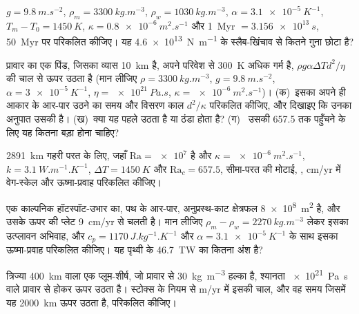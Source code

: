 \begin{exercise}[$\star$]\label{exo:b3:mantle-convection:4}
$g = \qty{9.8}{m.s^{-2}}$, $\rho_m = \qty{3300}{kg.m^{-3}}$, $\rho_w =
\qty{1030}{kg.m^{-3}}$, $\alpha = \qty{3.1e-5}{K^{-1}}$, $T_m - T_0 =
\qty{1450}{K}$, $\kappa = \qty{0.8e-6}{m^2.s^{-1}}$ और \qty{1}{Myr} $=
\qty{3.156e13}{s}$, \qty{50}{Myr} पर  परिकलित कीजिए। यह
\qty{4.6e13}{N.m^{-1}} के स्लैब-खिंचाव से कितने गुना छोटा है?
\end{exercise}

\begin{exercise}[$\star\star$]\label{exo:b3:mantle-convection:5}
प्रावार का एक पिंड, जिसका व्यास \qty{10}{km} है, अपने परिवेश से \qty{300}{K} अधिक गर्म है,
$\rho g\alpha\Delta Td^2/\eta$ की चाल से ऊपर उठता है (मान लीजिए $\rho =
\qty{3300}{kg.m^{-3}}$, $g = \qty{9.8}{m.s^{-2}}$, $\alpha = \qty{3e-5}{K^{-1}}$,
$\eta = \qty{e21}{Pa.s}$, $\kappa = \qty{e-6}{m^2.s^{-1}}$)। (क)~इसका
अपने ही आकार के आर-पार उठने का समय और विसरण काल $d^2/\kappa$ परिकलित कीजिए, और
दिखाइए कि उनका अनुपात उसकी  है। (ख)~क्या यह पहले उठता है या ठंडा होता है? (ग)~
उसकी  657.5 तक पहुँचने के लिए यह कितना बड़ा होना चाहिए?
\end{exercise}

\begin{exercise}[$\star\star$]\label{exo:b3:mantle-convection:6}
\qty{2891}{km} गहरी परत के लिए, जहाँ $\mathrm{Ra} = \num{e7}$ है और $\kappa =
\qty{e-6}{m^2.s^{-1}}$, $k = \qty{3.1}{W.m^{-1}.K^{-1}}$, $\Delta T =
\qty{1450}{K}$ और $\mathrm{Ra}_c = 657.5$, सीमा-परत की
मोटाई, , \unit{cm/yr} में वेग-स्केल और ऊष्मा-प्रवाह
परिकलित कीजिए।
\end{exercise}

\begin{exercise}[$\star\star$]\label{exo:b3:mantle-convection:7}
एक काल्पनिक हॉटस्पॉट-उभार का, पथ के आर-पार, अनुप्रस्थ-काट
क्षेत्रफल \qty{8e8}{m^2} है, और उसके ऊपर की प्लेट \qty{9}{cm/yr} से चलती है। मान लीजिए $\rho_m - \rho_w =
\qty{2270}{kg.m^{-3}}$ लेकर इसका उत्प्लावन अभिवाह, और $c_p =
\qty{1170}{J.kg^{-1}.K^{-1}}$ और $\alpha = \qty{3.1e-5}{K^{-1}}$ के साथ इसका ऊष्मा-प्रवाह परिकलित कीजिए।
यह पृथ्वी के \qty{46.7}{TW} का कितना अंश है?
\end{exercise}

\begin{exercise}[$\star\star$]\label{exo:b3:mantle-convection:8}
त्रिज्या \qty{400}{km} वाला एक प्लूम-शीर्ष, जो प्रावार से
\qty{30}{kg.m^{-3}} हल्का है, श्यानता \qty{e21}{Pa.s} वाले प्रावार से होकर ऊपर उठता है।
स्टोक्स के नियम से \unit{m/yr} में इसकी चाल, और वह समय जिसमें यह
\qty{2000}{km} ऊपर उठता है, परिकलित कीजिए।
\end{exercise}


